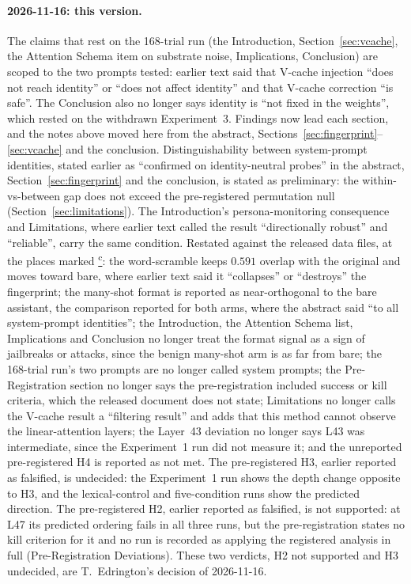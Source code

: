 \documentclass[11pt,a4paper]{article}
\newcommand{\corrmark}{\hyperref[sec:corrections]{\textsuperscript{c}}}
\begin{document}
\paragraph{2026-11-16: this version.}
The claims that rest on the 168-trial run (the Introduction,
Section~\ref{sec:vcache}, the Attention Schema item on substrate noise,
Implications, Conclusion) are scoped to the two prompts tested: earlier
text said that V-cache injection ``does not reach identity'' or ``does not
affect identity'' and that V-cache correction ``is safe''. The Conclusion
also no longer says identity is ``not fixed in the weights'', which rested
on the withdrawn Experiment~3.
Findings now lead each section, and the notes above moved here from the
abstract, Sections~\ref{sec:fingerprint}--\ref{sec:vcache} and the
conclusion.
Distinguishability between system-prompt identities, stated earlier as
``confirmed on identity-neutral probes'' in the abstract, Section~\ref{sec:fingerprint}
and the conclusion, is stated as preliminary: the within-vs-between gap does
not exceed the pre-registered permutation null (Section~\ref{sec:limitations}). The Introduction's persona-monitoring consequence and Limitations, where earlier text called the result ``directionally robust'' and ``reliable'', carry the same condition. Restated against the released data files, at the places marked
\corrmark: the word-scramble keeps $0.591$ overlap with the original and
moves toward bare, where earlier text said it ``collapses'' or ``destroys''
the fingerprint; the many-shot format is reported as near-orthogonal to the
bare assistant, the comparison reported for both arms, where the abstract
said ``to all system-prompt identities''; the Introduction, the Attention
Schema list, Implications and
Conclusion no longer treat the format signal as a sign of jailbreaks or
attacks, since the
benign many-shot arm is as far from bare; the 168-trial run's two
prompts are no longer called system prompts; the Pre-Registration section
no longer says the pre-registration included success or kill criteria,
which the released document does not state; Limitations no longer calls
the V-cache result a ``filtering result'' and adds that this method cannot
observe the linear-attention layers; the Layer~43 deviation no
longer says L43 was intermediate, since the Experiment~1 run did not measure
it; and the unreported pre-registered H4 is reported as not met.
The pre-registered H3, earlier reported as falsified, is undecided: the Experiment~1 run shows the depth change opposite to H3, and
the lexical-control and five-condition runs show the predicted direction.
The pre-registered H2, earlier reported as falsified, is not supported: at
L47 its predicted ordering fails in all three runs, but the
pre-registration states no kill criterion for it and no run is recorded as
applying the registered analysis in full (Pre-Registration Deviations).
These two verdicts, H2 not supported and H3 undecided, are T.~Edrington's
decision of 2026-11-16.



\end{document}
